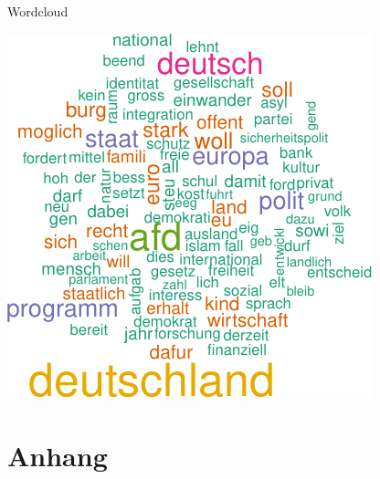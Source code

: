\begin{frame}[fragile]{Wordcloud}

\begin{Shaded}
\begin{Highlighting}[]
\NormalTok{(}\OperatorTok{$}\OperatorTok{$} \NormalTok{, }
     \NormalTok{(}\NormalTok{, }\NormalTok{), } \NormalTok{(}\NormalTok{, }\NormalTok{))}
\end{Highlighting}
\end{Shaded}

\begin{center}\includegraphics[width=0.8\linewidth]{PraDa_Folien_nm_2_files/figure-beamer/unnamed-chunk-41-1} \end{center}

\end{frame}

\section{Anhang}\label{anhang}
